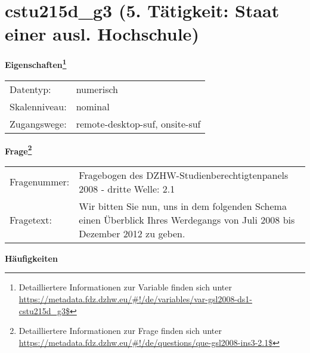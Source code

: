 
    \setcounter{footnote}{0}

    \vspace*{-1.8cm}
	\section{cstu215d\_g3 (5. Tätigkeit: Staat einer ausl. Hochschule)}
	\label{section:cstu215d_g3}



    \vspace*{0.5cm}
    \noindent\textbf{Eigenschaften\footnote{Detailliertere Informationen zur Variable finden sich unter
		\url{https://metadata.fdz.dzhw.eu/\#!/de/variables/var-gsl2008-ds1-cstu215d_g3$}}}\\
	\begin{tabularx}{\hsize}{@{}lX}
	Datentyp: & numerisch \\
	Skalenniveau: & nominal \\
	Zugangswege: &
	  remote-desktop-suf, 
	  onsite-suf
 \\
    \end{tabularx}



				\vspace*{0.5cm}
                \noindent\textbf{Frage\footnote{Detailliertere Informationen zur Frage finden sich unter
		              \url{https://metadata.fdz.dzhw.eu/\#!/de/questions/que-gsl2008-ins3-2.1$}}}\\
				\begin{tabularx}{\hsize}{@{}lX}
					Fragenummer: &
					  Fragebogen des DZHW-Studienberechtigtenpanels 2008 - dritte Welle:
					  2.1
 \\
					Fragetext: & Wir bitten Sie nun, uns in dem folgenden Schema einen Überblick Ihres Werdegangs von Juli 2008 bis Dezember 2012 zu geben. \\
				\end{tabularx}





        		\vspace*{0.5cm}
                \noindent\textbf{Häufigkeiten}

